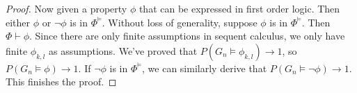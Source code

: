 \documentclass[a4paper, linespread=1.5]{article}
\begin{document}
\begin{proof}
        Now given a property $\phi$ that can be expressed in first order logic.
        Then either $\phi$ or $\neg\phi$ is in $\Phi^\models$.
        Without loss of generality, suppose $\phi$ is in $\Phi^\models$.
        Then $\Phi \vdash \phi$.
        Since there are only finite assumptions in sequent calculus, we only have finite $\phi_{k,l}$ as assumptions.
        We've proved that $P(G_n\models \phi_{k,l})\to 1$, so $P(G_n\models \phi)\to 1$.
        If $\neg\phi$ is in $\Phi^\models$, we can similarly derive that $P(G_n\models \neg\phi)\to 1$.
        This finishes the proof.


    \end{proof}
\end{document}
